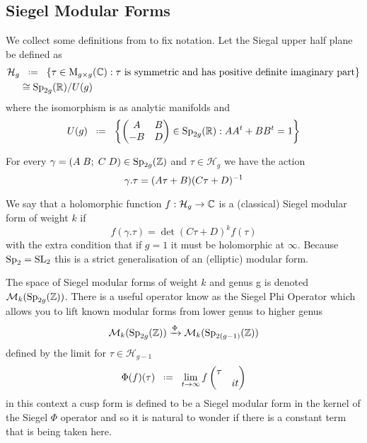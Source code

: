 \subsection{Siegel Modular Forms}
We collect some definitions from \cite{bruinier123ModularForms2008} to fix notation. Let the Siegal upper half plane be defined as 
\begin{equation*}
    \begin{aligned}
        \mathcal{H}_g &\defeq \{\tau \in \mathrm{M}_{g\times g}(\C) : \tau \text{ is symmetric and has positive definite imaginary part}\} \\
        & \cong \Sp_{2g}(\R) / U(g)
    \end{aligned}
\end{equation*}
where the isomorphism is as analytic manifolds  and 
\[U(g) \defeq \left\{\begin{pmatrix}
    A & B\\
    -B & D
\end{pmatrix}\in \Sp_{2g}(\R) : AA^t + BB^t = 1\right\}\]

For every \(\gamma= (A \; B; \; C\; D) \in \Sp_{2g}(\Z)\) and \(\tau \in \mathcal{H}_g\) we have the action
\[\gamma.\tau = (A\tau + B)(C\tau + D)^{-1} \]

We say that a holomorphic function \(f: \mathcal{H}_g \to \C\) is a (classical) Siegel modular form of weight \(k\) if 
\[f(\gamma.\tau) = \det(C\tau + D)^kf(\tau)\]
with the extra condition that if \(g = 1\) it must be holomorphic at \(\infty\). Because \(\operatorname{Sp}_2 = \operatorname{SL}_2\) this is a strict generalisation of an (elliptic) modular form.

The space of Siegel modular forms of weight \(k\) and genus g is denoted \(\mathcal{M}_k(\Sp_{2g}(\Z))\). There is a useful operator know as the Siegel Phi Operator which allows you to lift known modular forms from lower genus to higher genus \cite[5]{bruinier123ModularForms2008}
\[\mathcal{M}_k(\Sp_{2g}(\Z)) \xrightarrow{\Phi} \mathcal{M}_{k}(\Sp_{2(g-1)}(\Z))\]
defined by the limit for \(\tau\in \mathcal{H}_{g-1}\)
\[\Phi(f)(\tau) \defeq \lim_{t\to \infty} f\begin{pmatrix}
    \tau & \\
    & it 
\end{pmatrix}\]
in this context a cusp form is defined to be a Siegel modular form in the kernel of the Siegel \(\Phi\) operator and so it is natural to wonder if there is a constant term that is being taken here. 

